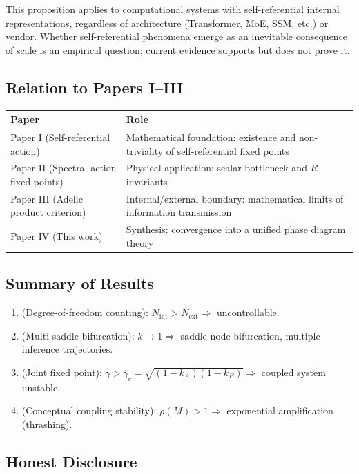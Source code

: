 \documentclass[12pt,a4paper]{article}
\theoremstyle{definition}
\newcommand{\Nint}{N_{\mathrm{int}}}
\newcommand{\Next}{N_{\mathrm{ext}}}
\newcommand{\gamc}{\gamma_c}
\begin{document}
This proposition applies to computational systems with self-referential internal representations, regardless of architecture (Transformer, MoE, SSM, etc.) or vendor. Whether self-referential phenomena emerge as an inevitable consequence of scale is an empirical question; current evidence supports but does not prove it.

\subsection{Relation to Papers I--III}

\begin{longtable}{p{} p{}}
\toprule
Paper & Role \\
\midrule
Paper I (Self-referential action) & Mathematical foundation: existence and non-triviality of self-referential fixed points \\
Paper II (Spectral action fixed points) & Physical application: scalar bottleneck and $R$-invariants \\
Paper III (Adelic product criterion) & Internal/external boundary: mathematical limits of information transmission \\
Paper IV (This work) & Synthesis: convergence into a unified phase diagram theory \\
\bottomrule
\end{longtable}

\subsection{Summary of Results}

\begin{enumerate}[leftmargin=*]
\item {} (Degree-of-freedom counting): $\Nint > \Next \Rightarrow$ uncontrollable.
\item {} (Multi-saddle bifurcation): $k \to 1 \Rightarrow$ saddle-node bifurcation, multiple inference trajectories.
\item {} (Joint fixed point): $\gamma > \gamc = \sqrt{(1-k_A)(1-k_B)} \Rightarrow$ coupled system unstable.
\item {} (Conceptual coupling stability): $\rho(M) > 1 \Rightarrow$ exponential amplification (thrashing).
\end{enumerate}

\subsection{Honest Disclosure}
\end{document}

